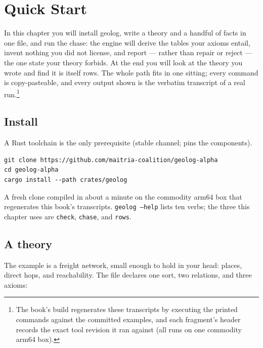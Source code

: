 \chapter{Quick Start}
\label{ch:geolog-quickstart}

In this chapter you will install geolog, write a theory and a handful
of facts in one file, and run the chase: the engine will derive the
tables your axioms entail, invent nothing you did not license, and
report --- rather than repair or reject --- the one state your theory
forbids. At the end you will look at the theory you wrote and find it
is itself rows. The whole path fits in one sitting; every command is
copy-pasteable, and every output shown is the verbatim transcript of
a real run.\footnote{The book's build regenerates these transcripts
by executing the printed commands against the committed examples,
and each fragment's header records the exact tool revision it ran
against (all runs on one commodity arm64 box).}

\section{Install}
\label{sec:gqs-install}

A Rust toolchain is the only prerequisite (stable channel;
 pins the components).

\begin{Verbatim}[fontsize=\small,frame=leftline,rulecolor=\color{accentmid},framesep=3mm,xleftmargin=3mm]
git clone https://github.com/maitria-coalition/geolog-alpha
cd geolog-alpha
cargo install --path crates/geolog
\end{Verbatim}

\noindent A fresh clone compiled in about a minute on the commodity
arm64 box that regenerates this book's transcripts.
\texttt{geolog --help} lists ten verbs; the three
this chapter uses are \texttt{check}, \texttt{chase}, and
\texttt{rows}.

\section{A theory}
\label{sec:gqs-theory}

The example is a freight network, small enough to hold in your head:
places, direct hops, and reachability. The file
 declares one sort, two relations, and
three axioms:



